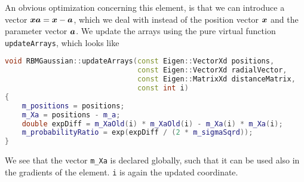 An obvious optimization concerning this element, is that we can introduce a vector $\boldsymbol{{xa}}=\boldsymbol{{x}}-\boldsymbol{{a}}$, which we deal with instead of the position vector $\boldsymbol{{x}}$ and the parameter vector $\boldsymbol{{a}}$. We update the arrays using the pure virtual function \lstinline|updateArrays|, which looks like
\begin{lstlisting}[language={c++},caption={Taken from \lstinline|rbmgaussian.cpp|.}]
void RBMGaussian::updateArrays(const Eigen::VectorXd positions,
							   const Eigen::VectorXd radialVector,
							   const Eigen::MatrixXd distanceMatrix,
							   const int i)
{
	m_positions = positions;
	m_Xa = positions - m_a;
	double expDiff = m_XaOld(i) * m_XaOld(i) - m_Xa(i) * m_Xa(i);
	m_probabilityRatio = exp(expDiff / (2 * m_sigmaSqrd));
}
\end{lstlisting}
We see that the vector \lstinline|m_Xa| is declared globally, such that it can be used also in the gradients of the element. \lstinline|i| is again the updated coordinate. 

